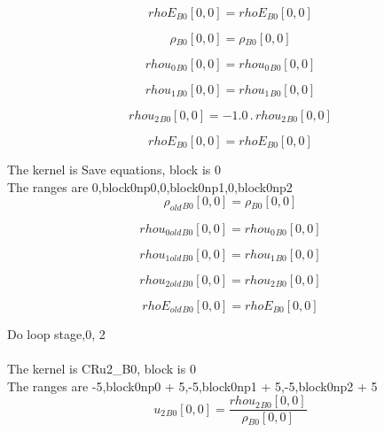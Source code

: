 \documentclass{article}
\begin{document}
\begin{dmath}{rhoE{_{B0}}}[{0,0}] = {rhoE{_{B0}}}[{0,0}]\end{dmath}

\begin{dmath}{\rho{_{B0}}}[{0,0}] = {\rho{_{B0}}}[{0,0}]\end{dmath}

\begin{dmath}{rhou_{0}{_{B0}}}[{0,0}] = {rhou_{0}{_{B0}}}[{0,0}]\end{dmath}

\begin{dmath}{rhou_{1}{_{B0}}}[{0,0}] = {rhou_{1}{_{B0}}}[{0,0}]\end{dmath}

\begin{dmath}{rhou_{2}{_{B0}}}[{0,0}] = - 1.0 \,.\, {rhou_{2}{_{B0}}}[{0,0}]\end{dmath}

\begin{dmath}{rhoE{_{B0}}}[{0,0}] = {rhoE{_{B0}}}[{0,0}]\end{dmath}

\noindent The kernel is Save equations, block is 0\\\noindent The ranges are 0,block0np0,0,block0np1,0,block0np2\\\begin{dmath}{\rho_{old}{_{B0}}}[{0,0}] = {\rho{_{B0}}}[{0,0}]\end{dmath}

\begin{dmath}{rhou_{0 old}{_{B0}}}[{0,0}] = {rhou_{0}{_{B0}}}[{0,0}]\end{dmath}

\begin{dmath}{rhou_{1 old}{_{B0}}}[{0,0}] = {rhou_{1}{_{B0}}}[{0,0}]\end{dmath}

\begin{dmath}{rhou_{2 old}{_{B0}}}[{0,0}] = {rhou_{2}{_{B0}}}[{0,0}]\end{dmath}

\begin{dmath}{rhoE_{old}{_{B0}}}[{0,0}] = {rhoE{_{B0}}}[{0,0}]\end{dmath}

\noindent Do loop stage,0, 2\\
\\\noindent The kernel is CRu2_B0, block is 0\\\noindent The ranges are -5,block0np0 + 5,-5,block0np1 + 5,-5,block0np2 + 5\\\begin{dmath}{u_{2}{_{B0}}}[{0,0}] = \frac{{rhou_{2}{_{B0}}}[{0,0}]}{{\rho{_{B0}}}[{0,0}]}\end{dmath}
\end{document}
